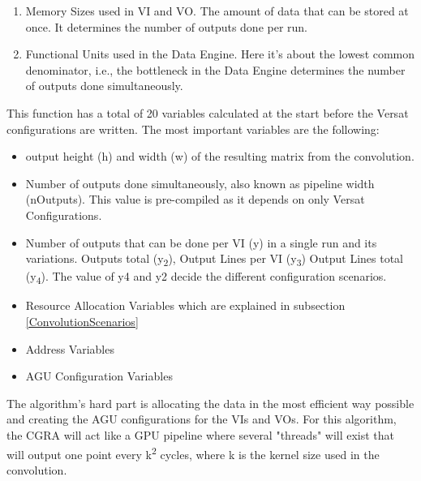 \begin{enumerate}
	\item Memory Sizes used in VI and VO. The amount of data that can be stored at once. It determines the number of outputs done per run.
	\item Functional Units used in the Data Engine. Here it's about the lowest common denominator, i.e., the bottleneck in the Data Engine determines the number of outputs done simultaneously.
  \end{enumerate}
 
This function has a total of 20 variables calculated at the start before the Versat configurations are written. The most important
variables are the following:

\begin{itemize}
	\item output height (h) and width (w) of the resulting matrix from the convolution.
	\item Number of outputs done simultaneously, also known as pipeline width (nOutputs). This value is pre-compiled as it depends on only Versat Configurations.
	\item Number of outputs that can be done per VI (y) in a single run and its variations. Outputs total (y\textsubscript{2}), Output Lines per VI (y\textsubscript{3}) Output Lines total (y\textsubscript{4}).
The value of y4 and y2 decide the different configuration scenarios.
	\item Resource Allocation Variables
which are explained in subsection \ref*{ConvolutionScenarios}
	\item Address Variables
	\item AGU Configuration Variables
  \end{itemize}

The algorithm's hard part is allocating the data in the most efficient way possible and creating the AGU configurations
for the VIs and VOs. For this algorithm, the CGRA will act like a GPU pipeline where several "threads" will exist
that will output one point every k\textsuperscript{2} cycles, where k is the kernel size used in the convolution.

